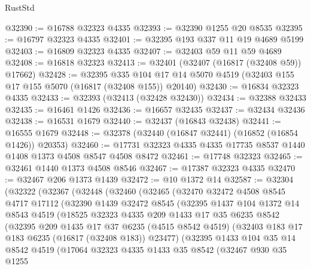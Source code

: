 \begin{lexlean}{RustStd}
\begin{coremodule}
{\begin{coremodule}
{{{{{{{{{{{{{{{{{{{{{{{{{{{{{{{{{{{{{{{{{{{{{{{{{{{{{{{@32390 := @16788 @32323 @4335
@32393 := @32390 @1255 @20 @8535
@32395 := @16797 @32323 @4335
@32401 := @32395 @193 @337 @11 @19 @4689 @5199
@32403 := @16809 @32323 @4335
@32407 := @32403 @59 @11 @59 @4689
@32408 := @16818 @32323
@32413 := @32401 (@32407 (@16817 (@32408 @59)) @17662)
@32428 := @32395
    @335
    @104
    @17
    @14
    @5070
    @4519
    (@32403 @155 @17 @155 @5070 (@16817 (@32408 @155)) @20140)
@32430 := @16834 @32323 @4335
@32433 := @32393 (@32413 (@32428 @32430))
@32434 := @32388 @32433
@32435 := @16461 @1426
@32436 := @16657 @32435
@32437 := @32434 @32436
@32438 := @16531 @1679
@32440 := @32437 (@16843 @32438)
@32441 := @16555 @1679
@32448 := @32378 (@32440 (@16847 @32441) (@16852 (@16854 @1426)) @20353)
@32460 := @17731 @32323 @4335 @4335 @17735 @8537 @1440 @1408 @1373 @4508 @8547 @4508 @8472
@32461 := @17748 @32323
@32465 := @32461 @1440 @1373 @4508 @8546
@32467 := @17387 @32323 @4335
@32470 := @32467 @206 @1373 @1439
@32472 := @10 @1372 @14
@32587 := @32304
    (@32322
      (@32367
        (@32448
          (@32460
            (@32465
              (@32470
                @32472
                @4508
                @8545
                @4717
                @17112
                (@32390
                  @1439
                  @32472
                  @8545
                  (@32395
                    @1437
                    @104
                    @1372
                    @14
                    @8543
                    @4519
                    (@18525
                      @32323
                      @4335
                      @209
                      @1433
                      @17
                      @35
                      @6235
                      @8542
                      (@32395
                        @209
                        @1435
                        @17
                        @37
                        @6235
                        (@4515 @8542 @4519)
                        (@32403 @183 @17 @183 @6235 (@16817 (@32408 @183)) @23477)
                        (@32395
                          @1433
                          @104
                          @35
                          @14
                          @8542
                          @4519
                          (@17064
                            @32323
                            @4335
                            @1433
                            @35
                            @8542
                            (@32467
                              @930
                              @35
                              @1255
}}}}}}}}}}}}}}}}}}}}}}}}}}}}}}}}}}}}}}}}}}}}}}}}}}}}}}}
\end{coremodule}}
\end{coremodule}
\end{lexlean}
